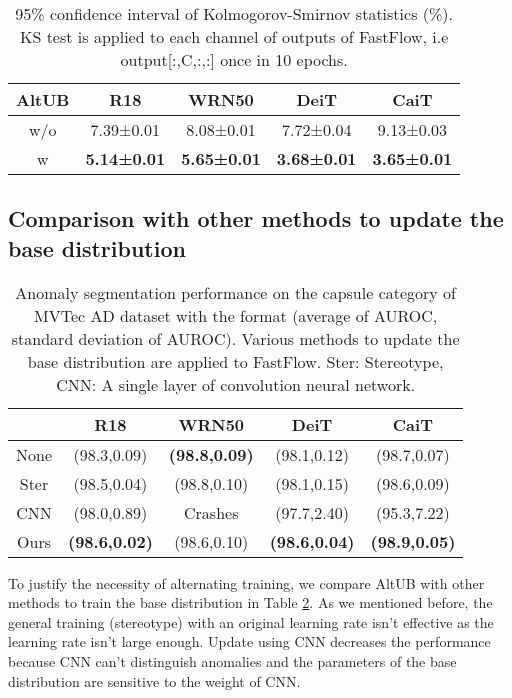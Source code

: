 \documentclass[letterpaper]{article}
\begin{document}
\begin{table}[t]
\caption{95\% confidence interval of Kolmogorov-Smirnov statistics (\%). KS test is applied to each channel of outputs of FastFlow, i.e output[:,C,:,:] once in 10 epochs.}
\label{table-fastflow-kstest}
\centering
\small{
\begin{tabular}{c|c|c|c|c}
\hline
AltUB & R18                 & WRN50            & DeiT                   & CaiT                   \\
\hline
w/o    & 7.39±0.01          & 8.08±0.01          & 7.72±0.04          & 9.13±0.03          \\
w      & \textbf{5.14±0.01} & \textbf{5.65±0.01} & \textbf{3.68±0.01} & \textbf{3.65±0.01} \\
\hline
\end{tabular}
}
\end{table}

\subsection{Comparison with other methods to update the base distribution}
\begin{table}[t]
\caption{Anomaly segmentation performance on the capsule category of MVTec AD dataset with the format (average of AUROC, standard deviation of AUROC). Various methods to update the base distribution are applied to FastFlow. Ster: Stereotype, CNN: A single layer of convolution neural network.}
\label{table-comparison}
\centering
\small{
\begin{tabular}{c|c|c|c|c}
\hline
           & R18         & WRN50       & DeiT        & CaiT        \\ \hline
None       & (98.3,0.09) & \textbf{(98.8,0.09)} & (98.1,0.12)          & (98.7,0.07) \\ 
Ster       & (98.5,0.04) & (98.8,0.10)          & (98.1,0.15)          & (98.6,0.09) \\ 
CNN        & (98.0,0.89) & Crashes              & (97.7,2.40)          & (95.3,7.22) \\ \hline
Ours      &  \textbf{(98.6,0.02)} & (98.6,0.10) & \textbf{(98.6,0.04)} & \textbf{(98.9,0.05)} \\ \hline
\end{tabular}
}
\end{table}

To justify the necessity of alternating training, we compare AltUB with other methods to train the base distribution in Table \ref{table-comparison}. As we mentioned before, the general training (stereotype) with an original learning rate isn't effective as the learning rate isn't large enough. Update using CNN decreases the performance because CNN can't distinguish anomalies and the parameters of the base distribution are sensitive to the weight of CNN. 
\end{document}
